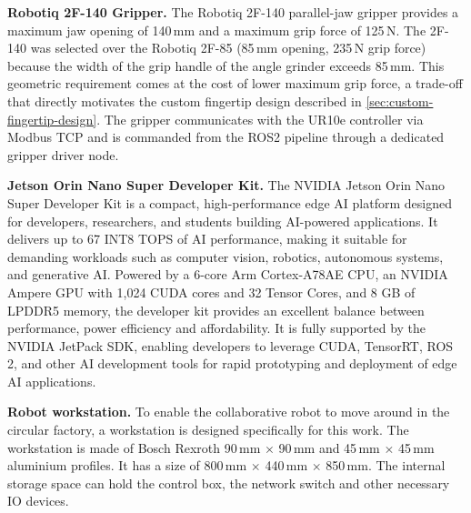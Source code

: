 \documentclass[oneside,studentpaper]{wbk}
\begin{document}
\textbf{Robotiq 2F-140 Gripper.} The Robotiq 2F-140 parallel-jaw gripper provides a maximum jaw opening of 140\,mm and a maximum grip force of 125\,N. The 2F-140 was selected over the Robotiq 2F-85 (85\,mm opening, 235\,N grip force) because the width of the grip handle of the angle grinder exceeds 85\,mm. This geometric requirement comes at the cost of lower maximum grip force, a trade-off that directly motivates the custom fingertip design described in \cref{sec:custom-fingertip-design}. The gripper communicates with the UR10e controller via Modbus TCP and is commanded from the ROS2 pipeline through a dedicated gripper driver node. 


\textbf{Jetson Orin Nano Super Developer Kit.} The NVIDIA Jetson Orin Nano Super Developer Kit is a compact, high-performance edge AI platform designed for developers, researchers, and students building AI-powered applications. It delivers up to 67 INT8 TOPS of AI performance, making it suitable for demanding workloads such as computer vision, robotics, autonomous systems, and generative AI. Powered by a 6-core Arm Cortex-A78AE CPU, an NVIDIA Ampere GPU with 1,024 CUDA cores and 32 Tensor Cores, and 8 GB of LPDDR5 memory, the developer kit provides an excellent balance between performance, power efficiency and affordability. It is fully supported by the NVIDIA JetPack SDK, enabling developers to leverage CUDA, TensorRT, ROS 2, and other AI development tools for rapid prototyping and deployment of edge AI applications. 


\textbf{Robot workstation.} To enable the collaborative robot to move around in the circular factory, a workstation is designed specifically for this work. The workstation is made of Bosch Rexroth 90\,mm $\times$ 90\,mm and 45\,mm $\times$ 45\,mm aluminium profiles. It has a size of 800\,mm $\times$ 440\,mm $\times$ 850\,mm. The internal storage space can hold the control box, the network switch and other necessary IO devices. 
\end{document}
